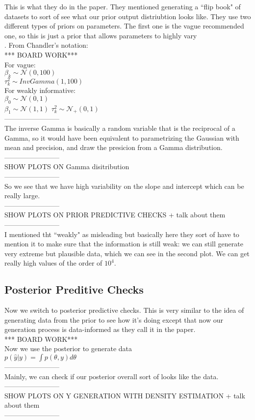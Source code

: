 \documentclass[]{article}
\begin{document}
This is what they do in the paper. They mentioned generating a ``flip book" of datasets to sort of see what our prior output distriubtion looks like. They use two different types of priors on parameters. The first one is the vague recommended one, so this is just a prior that allows parameters to highly vary\\. From Chandler's notation:\\
*** BOARD WORK***\\
For vague: \\
$\beta_k \sim \mathcal{N}(0,100)$\\
$\tau_k^2 \sim InvGamma(1,100)$\\
For weakly informative:\\
$\beta_0 \sim \mathcal{N}(0,1)$\\
$\beta_1 \sim \mathcal{N}(1,1)$
$\tau_k^2 \sim \mathcal{N}_{+}(0,1)$\\
------------------------\\
The inverse Gamma is basically a random variable that is the reciprocal of a Gamma, so it would have been equivalent to parametrizing the Gaussian with mean and precision, and draw the presicion from a Gamma distribution. \\
------------------------\\SHOW PLOTS ON Gamma disitribution\\  ------------------------\\
So we see that we have high variability on the slope and intercept which can be really large. \\
------------------------\\SHOW PLOTS ON PRIOR PREDICTIVE CHECKS + talk about them\\ ------------------------\\
I mentioned tht ``weakly" as misleading but basically here they sort of have to mention it to make sure that the information is still weak: we can still generate very extreme but plausible data, which we can see in the second plot. We can get really high values of the order of $10^4$. \\


\subsection*{Posterior Preditive Checks}
Now we switch to posterior predictive checks. This is very similar to the idea of generating data from the prior to see how it's doing except that now our generation process is data-informed as they call it in the paper.\\ 
*** BOARD WORK*** \\
Now we use the posterior to generate data \\
$p(\hat{y}| y) = \int p(\theta, y) d\theta$\\
------------------------\\
Mainly, we can check if our posterior overall sort of looks like the data.\\
------------------------ \\SHOW PLOTS ON Y GENERATION WITH DENSITY ESTIMATION + talk about them\\ ------------------------\\
\end{document}
